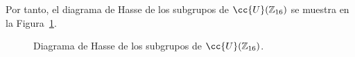 \begin{ejemplo}
    Por tanto, el diagrama de Hasse de los subgrupos de $\cc{U}(\mathbb{Z}_{16})$ se muestra en la Figura~\ref{fig:diagrama_hasse_subgrupos_UZ16}.
    \begin{figure}[h]
        \centering
        \caption{Diagrama de Hasse de los subgrupos de $\cc{U}(\mathbb{Z}_{16})$.}
        \label{fig:diagrama_hasse_subgrupos_UZ16}
    \end{figure}


\end{ejemplo}
